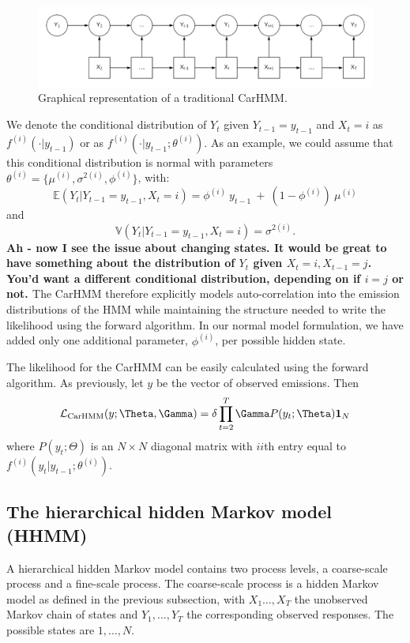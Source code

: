 \begin{figure}[ht]
	\centering
	\includegraphics[width=5in]{../Plots/CarHMM.png}
	\caption{Graphical representation of a traditional CarHMM.}
	\label{fig:CarHMM}
\end{figure}

%
We denote the conditional distribution of $Y_t$ given $Y_{t-1}= y_{t-1}$ and $ X_t=i$ as $f^{(i)}( \cdot | y_{t-1})$ or as
$f^{(i)}( \cdot | y_{t-1}; \theta^{(i)})$.
As an example, we could assume that this conditional distribution is normal with parameters $\theta^{(i)} = \{\mu^{(i)},\sigma^{2(i)},\phi^{(i)}\}$, with:
%
\[
\mathbb{E}(Y_t|Y_{t-1} = y_{t-1},X_t=i) = \phi^{(i)} ~ y_{t-1} ~+ ~(1-\phi^{(i)})  ~\mu^{(i)}
\]
and
\[
\mathbb{V}(Y_t| Y_{t-1} =y_{t-1}, X_t = i) = \sigma^{2(i)}.
\]
%
{\bf{Ah - now I see the issue about changing states.  It would be great to have something about the distribution of $Y_t$ given $X_t=i, X_{t-1}=j$. You'd want a different conditional distribution, depending on if $i=j$ or not.
}}
%
The CarHMM therefore explicitly models auto-correlation into the emission distributions of the HMM while maintaining the structure needed to write the likelihood using the forward algorithm. In our normal model formulation, we have added only one additional parameter, $\phi^{(i)}$,  per possible hidden state. 

The likelihood for the CarHMM can be easily calculated using the forward algorithm.  As previously, let $y$ be the vector of observed emissions.  Then
\begin{equation}
\calL_{\text{CarHMM}}(y;\Theta,\Gamma) = \delta \prod_{t=2}^T \Gamma P(y_t;\Theta) \mathbf{1}_N
\label{CarHMM_likelihood}
\end{equation}
where
%
$P(y_t;\Theta)$ is an $N \times N$ diagonal matrix with $ii$th entry equal to $f^{(i)}(y_t|y_{t-1}; \theta^{(i)})$.
%

\subsection{The hierarchical hidden Markov model (HHMM)}

A hierarchical hidden Markov model contains two process levels, a coarse-scale process and a fine-scale process.  The coarse-scale process is a hidden Markov model as defined in the previous subsection,  with  $X_1\ldots, X_T$ the unobserved Markov chain of states and $Y_1,\ldots, Y_T$ the corresponding observed responses.  The possible states are $1,\ldots, N$.   
%


